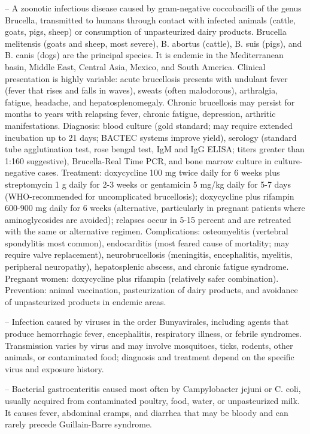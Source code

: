 -- A zoonotic infectious disease caused by gram-negative coccobacilli of the genus Brucella, transmitted to humans through contact with infected animals (cattle, goats, pigs, sheep) or consumption of unpasteurized dairy products. Brucella melitensis (goats and sheep, most severe), B. abortus (cattle), B. suis (pigs), and B. canis (dogs) are the principal species. It is endemic in the Mediterranean basin, Middle East, Central Asia, Mexico, and South America. Clinical presentation is highly variable: acute brucellosis presents with undulant fever (fever that rises and falls in waves), sweats (often malodorous), arthralgia, fatigue, headache, and hepatosplenomegaly. Chronic brucellosis may persist for months to years with relapsing fever, chronic fatigue, depression, arthritic manifestations. Diagnosis: blood culture (gold standard; may require extended incubation up to 21 days; BACTEC systems improve yield), serology (standard tube agglutination test, rose bengal test, IgM and IgG ELISA; titers greater than 1:160 suggestive), Brucella-Real Time PCR, and bone marrow culture in culture-negative cases. Treatment: doxycycline 100 mg twice daily for 6 weeks plus streptomycin 1 g daily for 2-3 weeks or gentamicin 5 mg/kg daily for 5-7 days (WHO-recommended for uncomplicated brucellosis); doxycycline plus rifampin 600-900 mg daily for 6 weeks (alternative, particularly in pregnant patients where aminoglycosides are avoided); relapses occur in 5-15 percent and are retreated with the same or alternative regimen. Complications: osteomyelitis (vertebral spondylitis most common), endocarditis (most feared cause of mortality; may require valve replacement), neurobrucellosis (meningitis, encephalitis, myelitis, peripheral neuropathy), hepatosplenic abscess, and chronic fatigue syndrome. Pregnant women: doxycycline plus rifampin (relatively safer combination). Prevention: animal vaccination, pasteurization of dairy products, and avoidance of unpasteurized products in endemic areas.

-- Infection caused by viruses in the order Bunyavirales, including agents that produce hemorrhagic fever, encephalitis, respiratory illness, or febrile syndromes. Transmission varies by virus and may involve mosquitoes, ticks, rodents, other animals, or contaminated food; diagnosis and treatment depend on the specific virus and exposure history.

-- Bacterial gastroenteritis caused most often by Campylobacter jejuni or C. coli, usually acquired from contaminated poultry, food, water, or unpasteurized milk. It causes fever, abdominal cramps, and diarrhea that may be bloody and can rarely precede Guillain-Barre syndrome.

